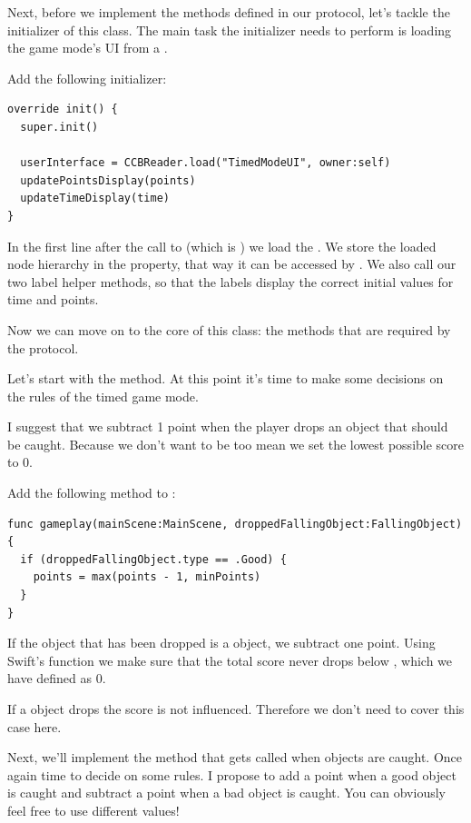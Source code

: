 Next, before we implement the methods defined in our protocol, let's tackle the
initializer of this class. The main task the initializer needs to perform is
loading the game mode's UI from a \ccbfile{}.
\begin{leftbar}
Add the following initializer:
\begin{lstlisting}
override init() {
  super.init()
  
  userInterface = CCBReader.load("TimedModeUI", owner:self)
  updatePointsDisplay(points)
  updateTimeDisplay(time)
}
\end{lstlisting}
\end{leftbar}
In the first line after the call to 
(which is ) we load the 
\ccbfile{}.
We store the loaded node hierarchy in the  property, that way it
can be accessed by .
We also call our two label helper methods, so that the labels display the
correct initial values for time and points.

Now we can move on to the core of this class: the methods that are required by
the  protocol.

Let's start with the  method. At this point it's time to make some
decisions on the rules of the timed game mode. 

I suggest that we subtract 1 point when the player
drops an object that should be caught. Because we don't want to be too mean we
set the lowest possible score to 0.

\begin{leftbar}
Add the following method to :
\begin{lstlisting}
func gameplay(mainScene:MainScene, droppedFallingObject:FallingObject) {
  if (droppedFallingObject.type == .Good) {
    points = max(points - 1, minPoints)
  }
}
\end{lstlisting}
\end{leftbar}
If the object that has been dropped is a  object, we subtract
one point. Using Swift's  function we make sure that the total
score never drops below , which we have defined as 0.

If a  object drops the score is not influenced. Therefore we
don't need to cover this case here.

Next, we'll implement the method that gets called when objects are caught.
Once again time to decide on some rules. I propose to add a point when a good
object is caught and subtract a point when a bad object is caught. You can
obviously feel free to use different values!


